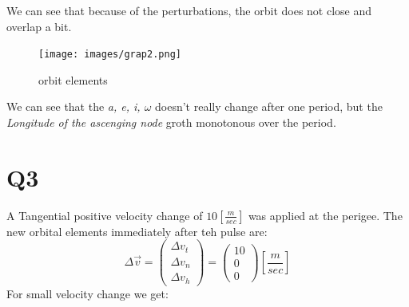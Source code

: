 \documentclass[11pt, a4paper]{article}
\begin{document}
\noindent We can see that because of the perturbations, the orbit does not close and overlap a bit.
\begin{figure}[H]
    \begin{center}
    \texttt{[image: images/grap2.png]}
    \caption{orbit elements}
    \end{center}
\end{figure}
We can see that the \emph{a, e, i, $\omega$} doesn't really change after one period, but the \emph{Longitude of the ascenging node} groth monotonous over the period.
\newpage

\section{Q3}
A Tangential positive velocity change of $10\left[\frac{m}{sec}\right]$ was applied at the perigee. The new orbital elements immediately after teh pulse are:
\begin{equation}
    \Delta\vec{v} = \begin{pmatrix}
        \Delta v_t \\
        \Delta v_n \\
        \Delta v_h
    \end{pmatrix}
    =
    \begin{pmatrix}
        10 \\ 0 \\ 0
    \end{pmatrix}
    \left[\frac{m}{sec}\right]
\end{equation}
For small velocity change we get:
\end{document}
